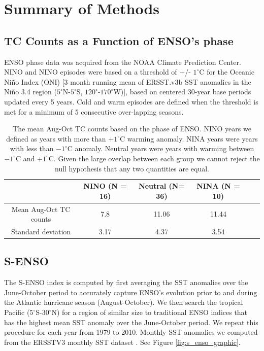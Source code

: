\section{Summary of Methods}
\subsection{TC Counts as a Function of ENSO's phase}
ENSO phase data was acquired from the NOAA Climate Prediction Center. NINO and NINO episodes were based on a threshold of +/- $1^\circ$C for the Oceanic Ni\~{n}o Index (ONI) [3 month running mean of ERSST.v3b SST anomalies in the Ni\~{n}o 3.4 region ($5^\circ$N-$5^\circ$S, $120^\circ$-$170^\circ$W)], based on centered 30-year base periods updated every 5 years. Cold and warm episodes are defined when the threshold is met for a minimum of 5 consecutive over-lapping seasons.

\begin{table}
\begin{tabular}{cccccc}
\hline
&NINO (N = 16) & Neutral (N= 36) & NINA (N = 10)\\
\hline
Mean Aug-Oct TC counts & 7.8 & 11.06 & 11.44\\
Standard deviation & 3.17 & 4.37 & 3.54\\
\hline
\end{tabular}
\caption{The mean Aug-Oct TC counts based on the phase of ENSO. NINO years we defined as years with more than $+1^\circ$C warming anomaly. NINA years were years with less than $-1^\circ$C anomaly. Neutral years were years with warming between $-1^\circ$C and $+1^\circ$C. Given the large overlap between each group we cannot reject the null hypothesis that any two quantities are equal.}
\label{ref:table_nino_vs_tc_counts}
\end{table}

\subsection{S-ENSO}
The S-ENSO index is computed by first averaging the SST anomalies over the June-October period to accurately capture ENSO's evolution prior to and during the Atlantic hurricane season (August-October). We then search the tropical Pacific ($5^\circ$S-$30^\circ$N) for a region of similar size to traditional ENSO indices that has the highest mean SST anomaly over the June-October period. We repeat this procedure for each year from 1979 to 2010. Monthly SST anomalies we computed from the ERSSTV3 monthly SST dataset \cite{reynolds2002}. See Figure \ref{fig:s_enso_graphic}.

